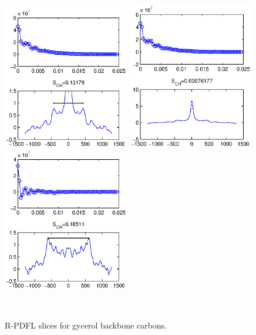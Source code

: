 \documentclass[aps,prl,superscriptaddress,twocolumn]{revtex4}
\begin{document}
\begin{figure}[!htb]
  \centering
  \includegraphics[width=5.5cm]{../Figs/g1_slice_large.eps}
  \includegraphics[width=5.5cm]{../Figs/g1_slice_small.eps}
  \includegraphics[width=5.5cm]{../Figs/g2_slice.eps}
  \caption{\label{glycerolNMR}
    R-PDFL slices for gycerol backbone carbons.
  }
   \\
\end{figure}
\end{document}
